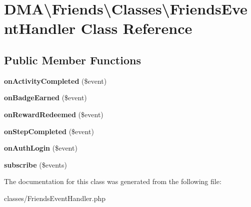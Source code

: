 \hypertarget{classDMA_1_1Friends_1_1Classes_1_1FriendsEventHandler}{\section{D\-M\-A\textbackslash{}Friends\textbackslash{}Classes\textbackslash{}Friends\-Event\-Handler Class Reference}
\label{classDMA_1_1Friends_1_1Classes_1_1FriendsEventHandler}
}
\subsection*{Public Member Functions}
\begin{DoxyCompactItemize}
\item 
\hypertarget{classDMA_1_1Friends_1_1Classes_1_1FriendsEventHandler_aca0544953a69d38c57a9756d3712d900}{{\bfseries on\-Activity\-Completed} (\$event)}\label{classDMA_1_1Friends_1_1Classes_1_1FriendsEventHandler_aca0544953a69d38c57a9756d3712d900}

\item 
\hypertarget{classDMA_1_1Friends_1_1Classes_1_1FriendsEventHandler_a6410881fab2b5c74f546a7585be11201}{{\bfseries on\-Badge\-Earned} (\$event)}\label{classDMA_1_1Friends_1_1Classes_1_1FriendsEventHandler_a6410881fab2b5c74f546a7585be11201}

\item 
\hypertarget{classDMA_1_1Friends_1_1Classes_1_1FriendsEventHandler_a81f3a3f753d8ef9dd4f4f09f37b216bd}{{\bfseries on\-Reward\-Redeemed} (\$event)}\label{classDMA_1_1Friends_1_1Classes_1_1FriendsEventHandler_a81f3a3f753d8ef9dd4f4f09f37b216bd}

\item 
\hypertarget{classDMA_1_1Friends_1_1Classes_1_1FriendsEventHandler_a4d3c29aaa251e727c832b3dc852c0401}{{\bfseries on\-Step\-Completed} (\$event)}\label{classDMA_1_1Friends_1_1Classes_1_1FriendsEventHandler_a4d3c29aaa251e727c832b3dc852c0401}

\item 
\hypertarget{classDMA_1_1Friends_1_1Classes_1_1FriendsEventHandler_a480d5807466962402ccc13260cfb0930}{{\bfseries on\-Auth\-Login} (\$event)}\label{classDMA_1_1Friends_1_1Classes_1_1FriendsEventHandler_a480d5807466962402ccc13260cfb0930}

\item 
\hypertarget{classDMA_1_1Friends_1_1Classes_1_1FriendsEventHandler_a92cad97622be6dd1ed477dcc05d81074}{{\bfseries subscribe} (\$events)}\label{classDMA_1_1Friends_1_1Classes_1_1FriendsEventHandler_a92cad97622be6dd1ed477dcc05d81074}

\end{DoxyCompactItemize}


The documentation for this class was generated from the following file\-:\begin{DoxyCompactItemize}
\item 
classes/Friends\-Event\-Handler.\-php\end{DoxyCompactItemize}
